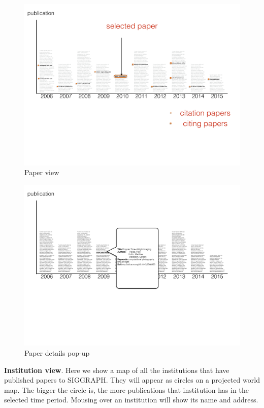 \documentclass[dvips,12pt]{article}
\begin{document}
\begin{figure}[htb!]
    \centering
    \includegraphics[width=\paperwidth]{visproposalDrawing_page_Part_2.pdf}
    \caption{Paper view}
    \label{fig:paper_view}
\end{figure}

\begin{figure}[htb!]
    \centering
    \includegraphics[width=\paperwidth]{visproposalDrawing_page_Part_8.pdf}
    \caption{Paper details pop-up}
    \label{fig:pop-up}
\end{figure}

\textbf{Institution view}. Here we show a map of all the institutions that have published papers to SIGGRAPH. They will appear as circles on a projected world map. The bigger the circle is, the more publications that institution has in the selected time period. Mousing over an institution will show its name and address.
\end{document}
